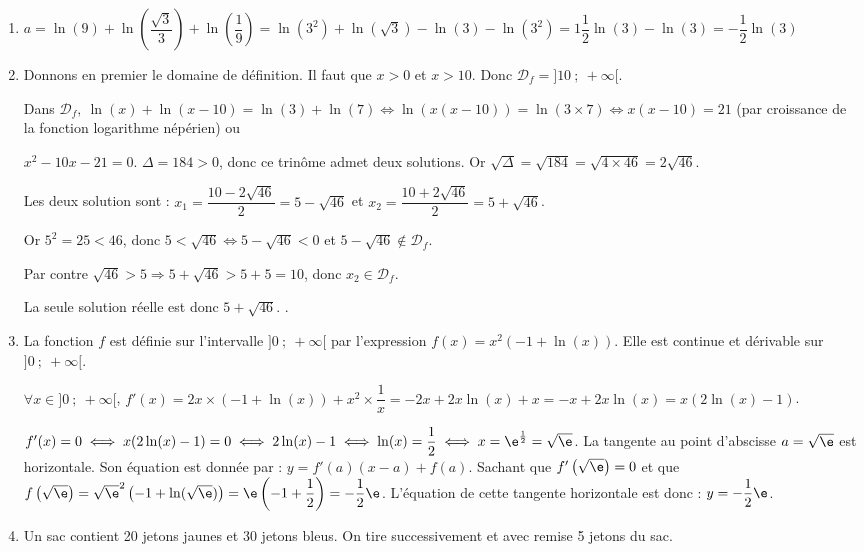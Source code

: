 \medskip

\begin{enumerate}
	\item $a = \ln (9) + \ln \left(\dfrac{\sqrt{3}}{3} \right)  + \ln \left(\dfrac19 \right)=\ln\left(3^2\right)+\ln\left(\sqrt{3}\right)-\ln(3) -\ln\left(3^2\right)=1\dfrac12\ln(3)-\ln(3)=-\dfrac12\ln(3)$
	
	\hfill {}
	\item Donnons en premier le domaine de définition. Il faut que $x> 0$ et $x>10$. Donc 
	$\mathcal{D}_f = ]10~;~+\infty[$.
	
Dans $\mathcal{D}_f, \: \ln(x) + \ln (x - 10) = \ln(3) + \ln(7) \iff \ln\left(x(x - 10)\right)= \ln(3 \times 7) \iff x(x-10) = 21$  (par croissance de la fonction logarithme népérien) ou 

$x^2 - 10x - 21 = 0$. $\Delta=184 > 0$, donc ce trinôme admet deux solutions. Or $\sqrt{\Delta}=\sqrt{184} = \sqrt{4 \times 46} = 2\sqrt{46}$.

Les deux solution sont : $x_1= \dfrac{10 -2\sqrt{46}}{2}=5 -\sqrt{46}$ et $x_2=\dfrac{10+2\sqrt{46}}{2}=5+\sqrt{46}$.

Or $5^2 = 25 < 46$, donc $5 < \sqrt{46} \iff 5 - \sqrt{46}< 0$ et $5 - \sqrt{46} \notin \mathcal{D}_f$.

Par contre $\sqrt{46} > 5 \Rightarrow 5 + \sqrt{46} > 5 + 5 = 10$, donc $x_2 \in \mathcal{D}_f$.

La seule solution réelle est donc $5 + \sqrt{46}$.
\hfill {}.
	 \item La fonction $f$ est définie sur l'intervalle $]0~;~+ \infty[$ par l'expression $f(x) = x^2(- 1 + \ln(x))$. Elle est continue et dérivable sur $]0~;~+ \infty[$.

	 $\forall x \in ]0~;~+ \infty[$, $f'(x)=2x\times (- 1 + \ln(x))+x^2\times \dfrac1x=-2x+2x\ln(x)+x=-x+2x\ln(x)=x(2\ln(x)-1)$.

	 $f'(x)=0 \iff x(2\ln(x)-1)=0 \iff 2\ln(x)-1 \iff \ln(x)=\dfrac{1}{2} \iff x=\e^{\frac12}=\sqrt{\e}$.
	 La tangente au point d'abscisse $a=\sqrt{\e}$ est horizontale. Son équation est donnée par : $y=f'(a)(x-a)+f(a)$.
	 Sachant que $f'\left(\sqrt{\e}\right)=0$ et que $f\left(\sqrt{\e}\right)= \sqrt{\e}^2\left(-1+\ln(\sqrt{\e})\right)=\e\left(-1+\dfrac12\right)= -\dfrac12\e$.
	 L'équation de cette tangente horizontale est donc : $y = -\dfrac12\e$.

\hfill {}
	 \item Un sac contient 20 jetons jaunes et 30 jetons bleus. On tire successivement et avec remise 5 jetons du sac.


\end{enumerate}
